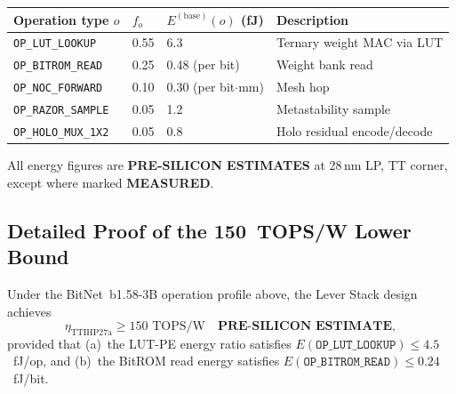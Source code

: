 \begin{center}
\begin{tabular}{llll}
\toprule
Operation type \(o\) & \(f_{o}\) & \(E^{(\mathrm{base})}(o)\) (fJ) & Description \\
\midrule
\texttt{OP\_LUT\_LOOKUP}   & 0.55 & 6.3 & Ternary weight MAC via LUT \\
\texttt{OP\_BITROM\_READ}  & 0.25 & 0.48 (per bit) & Weight bank read \\
\texttt{OP\_NOC\_FORWARD}  & 0.10 & 0.30 (per bit\(\cdot\)mm) & Mesh hop \\
\texttt{OP\_RAZOR\_SAMPLE} & 0.05 & 1.2 & Metastability sample \\
\texttt{OP\_HOLO\_MUX\_1X2} & 0.05 & 0.8 & Holo residual encode/decode \\
\bottomrule
\end{tabular}
\end{center}

All energy figures are \textbf{PRE-SILICON ESTIMATES} at 28\,nm LP, TT corner,
except where marked \textbf{MEASURED}.

\subsection{Detailed Proof of the 150~TOPS/W Lower Bound}
\label{sec:proof_150_topsw}

\begin{theorem}
\label{thm:tops_w_lb}
Under the BitNet~b1.58-3B operation profile above, the Lever Stack design
achieves
\[
  \eta_{\mathrm{TTIHP27a}} \geq 150\text{ TOPS/W}
  \quad \textbf{PRE-SILICON ESTIMATE},
\]
provided that (a)~the LUT-PE energy ratio satisfies
\(E(\mathtt{OP\_LUT\_LOOKUP}) \leq 4.5\)~fJ/op, and (b)~the BitROM
read energy satisfies \(E(\mathtt{OP\_BITROM\_READ}) \leq 0.24\)~fJ/bit.
\end{theorem}

